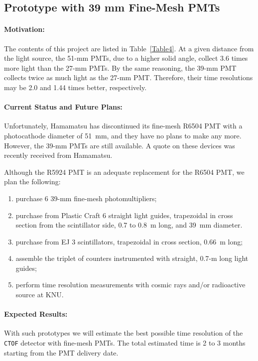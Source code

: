 \documentclass[12pt]{article}
\begin{document}
\subsection{Prototype with 39 mm Fine-Mesh PMTs} 

\paragraph{Motivation:}  The contents of this project are listed in 
Table~\ref{Table4}.  At a given distance from the light source, the 51-mm  
PMTs, due to a higher solid angle, collect 3.6 times more light than the
27-mm PMTs.  By the same reasoning, the 39-mm PMT collects twice as much light 
as the 27-mm PMT.  Therefore, their time resolutions may be 2.0 and 1.44 
times better, respectively.  

\paragraph{Current Status and Future Plans:} 
Unfortunately, Hamamatsu has discontinued its fine-mesh R6504 PMT with a 
photocathode diameter of 51~mm, and they have no plans to make any more.
However, the 39-mm PMTs are still available.  A quote on these devices
was recently received from Hamamatsu.

Although the R5924 PMT is an adequate replacement for the R6504 PMT, we 
plan the following:

\begin{enumerate}
  \item purchase 6 39-mm fine-mesh photomultipliers; 
  \item purchase from Plastic Craft 6 straight light guides, trapezoidal 
        in cross section from the scintillator side, 0.7 to 0.8~m long, and
        39~mm diameter.
  \item purchase from EJ 3 scintillators, trapezoidal in cross section, 
        0.66~m long;
  \item assemble the triplet of counters instrumented with straight, 0.7-m  
        long light guides;
  \item perform time resolution measurements with cosmic rays and/or 
        radioactive source at KNU.
\end{enumerate}

\paragraph{Expected Results:} 
With such prototypes we will estimate the best possible time resolution of 
the {\tt CTOF} detector with fine-mesh PMTs.  The total estimated time is
2 to 3 months starting from the PMT delivery date.
\end{document}
